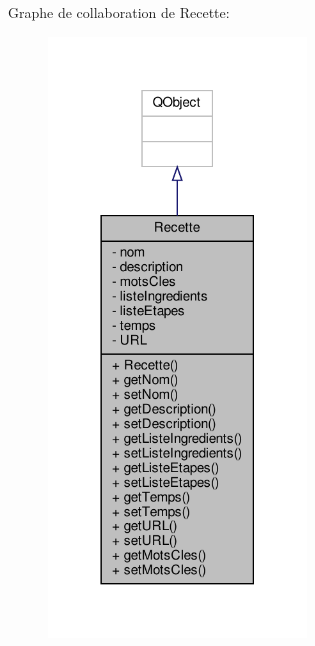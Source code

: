 Graphe de collaboration de Recette\+:\nopagebreak
\begin{figure}[H]
\begin{center}
\leavevmode
\includegraphics[width=194pt]{classRecette__coll__graph}
\end{center}
\end{figure}
